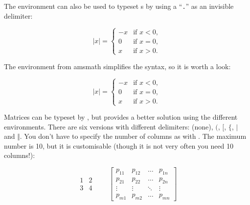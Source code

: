 The  environment can also be used to typeset s by
using a ``\verb|.|'' as an invisible  delimiter:
\begin{example}
\begin{equation*}
  |x| = \left\{
    \begin{array}{rl}
      -x & \text{if } x < 0,\\
      0 & \text{if } x = 0,\\
      x & \text{if } x > 0.
    \end{array} \right.
\end{equation*}
\end{example}
The  environment from \textsf{amsmath} simplifies
the syntax, so it is worth a look:
\begin{example}
  \begin{equation*}
    |x| = 
    \begin{cases}
      -x & \text{if } x < 0,\\
      0 & \text{if } x = 0,\\
      x & \text{if } x > 0.
    \end{cases} 
\end{equation*}
\end{example}


Matrices can be typeset by , but
 provides a better solution using the different 
environments. There are six versions with different delimiters: 
(none),  $($,  $[$,  $\{$,  $\vert$ and
 $\Vert$. You don't have to specify the number of columns as with
. The maximum number is 10, but it is customisable (though it is not
very often you need 10 columns!):
\begin{example}
\begin{equation*}
  \begin{matrix} 
    1 & 2 \\
    3 & 4 
  \end{matrix} \qquad
  \begin{bmatrix} 
    p_{11} & p_{12} & \ldots 
    & p_{1n} \\
    p_{21} & p_{22} & \ldots 
    & p_{2n} \\
    \vdots & \vdots & \ddots 
    & \vdots \\
    p_{m1} & p_{m2} & \ldots 
    & p_{mn} 
  \end{bmatrix}
\end{equation*}
\end{example}



